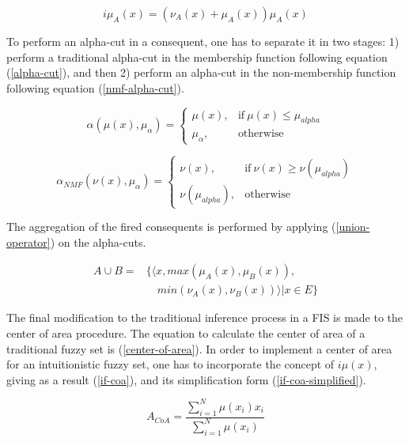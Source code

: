 \documentclass[review]{elsarticle}
\begin{document}
\begin{equation}
  \label{imembership}
  i\mu_{A}(x) = (\nu_{A}(x) + \mu_{A}(x))\mu_{A}(x)
\end{equation}

To perform an alpha-cut in a consequent, one has to separate it in two stages:
1) perform a traditional alpha-cut in the membership function following equation
(\ref{alpha-cut}), and then 2) perform an alpha-cut in the non-membership
function following equation (\ref{nmf-alpha-cut}).

\begin{equation}
  \label{alpha-cut}
  \alpha(\mu (x),\mu_{\alpha}) =
  \begin{cases}
    \mu (x), & \text{if}\ \mu (x) \leq \mu_{alpha}  \\
    \mu_{\alpha}, & \text{otherwise}
  \end{cases}
\end{equation}

\begin{equation}
  \label{nmf-alpha-cut}
  \alpha_{NMF}(\nu (x),\mu_{\alpha}) =
  \begin{cases}
    \nu (x), & \text{if}\ \nu (x) \geq \nu (\mu_{alpha})  \\
    \nu (\mu_{alpha}), & \text{otherwise}
  \end{cases}
\end{equation}

The aggregation of the fired consequents is performed by applying
(\ref{union-operator}) on the alpha-cuts.

\begin{equation}
  \label{union-operator}
  \begin{aligned}
    A \cup B  = &\{ \langle x, max(\mu_{A} (x), \mu_{B} (x)),\\
    &\quad min(\nu_{A} (x), \nu_{B} (x)) \rangle | x \in E \}
\end{aligned}
\end{equation}

The final modification to the traditional inference process in a FIS is made to
the center of area procedure. The equation to calculate the center of area of a
traditional fuzzy set is (\ref{center-of-area}). In order to implement a center
of area for an intuitionistic fuzzy set, one has to incorporate the concept of
$i\mu(x)$, giving as a result (\ref{if-coa}), and its simplification form
(\ref{if-coa-simplified}).

\begin{equation}
  \label{center-of-area}
  A_{CoA} = \dfrac{\sum_{i=1}^{N} \mu(x_{i})
    x_{i}}{\sum_{i=1}^{N} \mu(x_{i})}
\end{equation}
\end{document}

